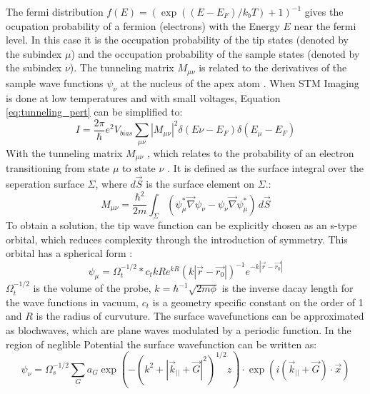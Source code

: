 \noindent The fermi distribution $f(E)= (\exp((E-E_F)/k_b T)+1)^{-1}$ gives the ocupation probability of a fermion (electrons) with the Energy $E$ near the fermi level.
In this case it is the occupation probability of the tip states (denoted by the subindex $\mu$) and the occupation probability of the sample states (denoted by the subindex $\nu$).
The tunneling matrix $M_{\mu \nu}$ is related to the derivatives of the sample wave functions $\psi_{\nu} $ at the nucleus of the apex atom \cite{tunnelmatrix}.
When STM Imaging is done at low temperatures and with small voltages, Equation \ref{eq:tunneling_pert} can be simplified to:
\begin{equation}
    I = \frac{2 \pi}{\hbar} e^2 V_{bias} \sum_{\mu \nu}  |M_{\mu \nu}|^2 \delta(E{\nu}-E_F) \delta(E_{\mu}- E_{F})
    \label{eq:tunneling_pert_simple}
\end{equation}
With the tunneling matrix $M_{\mu \nu}$ , which relates to the probability of an electron transitioning from state $\mu$ to state $\nu$ \cite{tunnelmatrix}.
It is defined as the surface integral over the seperation surface $\Sigma$, where $d\vec{S}$ is the surface element on $\Sigma$.: 
\begin{equation}
    M_{\mu \nu} = \frac{\hbar^2}{2m} \int_{\Sigma} (\psi_{\mu}^{*} \vec{\nabla} \psi_{\nu} - \psi_{\nu} \vec{\nabla} \psi_{\mu}^{*}) \, d\vec{S}
    \label{eq:tunnelin_matrix}
\end{equation}
To obtain a solution, the tip wave function can be explicitly chosen as an s-type orbital, which reduces complexity through the introduction of symmetry.
This orbital has a spherical form \cite{PhysRevLett}:
\begin{equation}
    \psi_{\mu} = \Omega_t^{-1/2} * c_t k R e^{kR} ( k|\vec{r}- \vec{r_0}|)^{-1} e^{-k|\vec{r}- \vec{r_0}|}
    \label{eq:tip_wave}
\end{equation}
$\Omega_t^{-1/2}$ is the volume of the probe, $k = \hbar^{-1} \sqrt{2m\phi}$ is the inverse dacay length for the wave functions in vacuum, $c_t$ is a geometry specific constant on the order of 1 and $R$ is the radius of curvuture.
The surface wavefunctions can be approximated as blochwaves, which are plane waves modulated by a periodic function.
In the region of neglible Potential the surface wavefunction can be written as:
\begin{equation}
    \psi_{\nu} = \Omega_{s}^{-1/2} \sum_{G} a_G \exp(- (k^2 + |\vec{k}_{||} + \vec{G}|^2)^{1/2} z)\cdot \exp(i(\vec{k}_{||} + \vec{G})\cdot \vec{x})
    \label{eq:surface_wave}
\end{equation}
